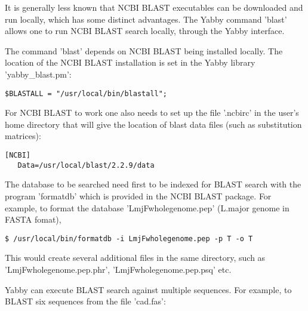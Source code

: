 It is generally less known that NCBI BLAST executables can be
downloaded \cite{ftpblast} and run locally, which has some
distinct advantages. The Yabby command 'blast' allows one to
run NCBI BLAST search locally, through the Yabby interface. 

The command 'blast' depends on NCBI BLAST being installed locally.
The location of the NCBI BLAST installation is set in the
Yabby library 'yabby\_blast.pm':

\begin{verbatim}
$BLASTALL = "/usr/local/bin/blastall";
\end{verbatim}

For NCBI BLAST to work one also needs to set up the file
'.ncbirc' in the user's home directory that will give the
location of blast data files (such as substitution matrices): 

\begin{verbatim}
[NCBI]
   Data=/usr/local/blast/2.2.9/data
\end{verbatim}

The database to be searched need first to be indexed for BLAST
search with the program 'formatdb' which is provided in the
NCBI BLAST package.  For example, to format the database
'LmjFwholegenome.pep' (L.major genome in FASTA fomat),

\begin{verbatim}
$ /usr/local/bin/formatdb -i LmjFwholegenome.pep -p T -o T
\end{verbatim}

This would create several additional files in the same directory,
such as 'LmjFwholegenome.pep.phr', 'LmjFwholegenome.pep.psq' etc.

Yabby can execute BLAST search against multiple sequences. For
example, to BLAST six sequences from the file 'cad.fas':

